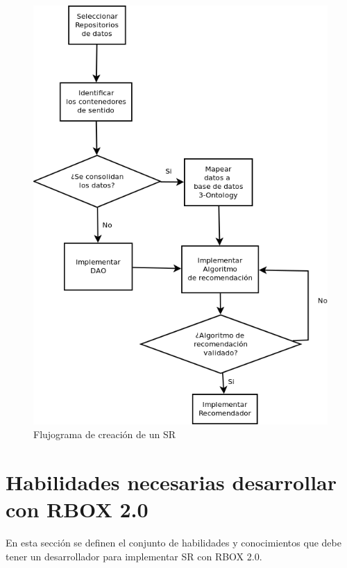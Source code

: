 \begin{figure}[tp]
	\centering
	\includegraphics[scale=.6]{images/procesoconstruccionSR.png}
	\caption{Flujograma de creación de un SR }
	\label{fig:procesoconstruccionSR}
\end{figure}

\section{Habilidades necesarias desarrollar con RBOX 2.0}

En esta sección se definen el conjunto de habilidades y conocimientos que debe tener un desarrollador para implementar SR con RBOX 2.0.

